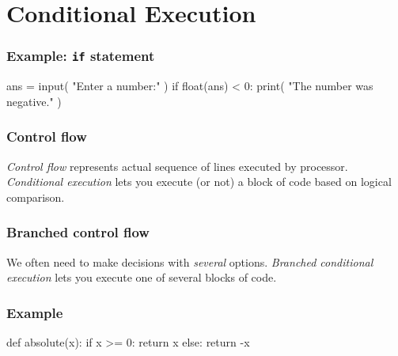 \documentclass[11pt]{beamer}
\begin{document}
\section{Conditional Execution}

\begin{frame}[fragile]
  \frametitle{Example:  \texttt{if} statement}
  \Enlarge

  \begin{semiverbatim}
ans = input( "Enter a number:" )
if float(ans) < 0:
    print( "The number was negative." )
  \end{semiverbatim}
\end{frame}

\begin{frame}[fragile]
  \frametitle{Control flow}
  \Enlarge

  \begin{itemize}
  \myitem  \emph{Control flow} represents actual sequence of lines executed by processor.
  \myitem  \emph{Conditional execution} lets you execute (or not) a block of code based on logical comparison.
  \end{itemize}
\end{frame}

\begin{frame}[fragile]
  \frametitle{Branched control flow}
  \Enlarge

  \begin{itemize}
  \myitem  We often need to make decisions with \emph{several} options.
  \myitem  \emph{Branched conditional execution} lets you execute one of several blocks of code.
  \end{itemize}
\end{frame}

\begin{frame}[fragile]
  \frametitle{Example}
  \Enlarge

  \begin{semiverbatim}
def absolute(x):
    if x >= 0:
        return x
    else:
        return -x
  \end{semiverbatim}
\end{frame}
\end{document}
